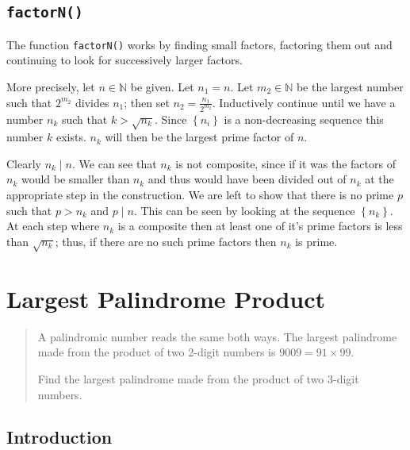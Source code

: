 \documentclass[oneside,12pt]{book}   	%
\newcounter{ex}
\newcounter{pr}
\theoremstyle{definition}
\newcommand{\set}[1]{\left\{#1\right\}}
\begin{document}
\begin{spacing}{1.618}
		\section{\texttt{factorN()}}
		
			The function \texttt{factorN()} works by finding small factors, factoring them out and continuing to look for successively larger factors.
		
			More precisely, let $n\in \mathbb{N}$ be given. Let $n_1=n$. Let $m_2\in\mathbb{N}$ be the largest number such that $2^{m_2}$ divides $n_1$; then set $n_2=\frac{n_1}{2^{m_2}}$. Inductively continue until we have a number $n_k$ such that $k>\sqrt{n_k}$. Since $\set{n_i}$ is a non-decreasing sequence this number $k$ exists. $n_k$ will then be the largest prime factor of $n$. 
			
			Clearly $n_k\mid n$. We can see that $n_k$ is not composite, since if it was the factors of $n_k$ would be smaller than $n_k$ and thus would have been divided out of $n_k$ at the appropriate step in the construction. We are left to show that there is no prime $p$ such that $p>n_k$ and $p\mid n$. This can be seen by looking at the sequence $\set{n_k}$. At each step where $n_k$ is a composite then at least one of it's prime factors is less than $\sqrt{n_k}$; thus, if there are no such prime factors then $n_k$ is prime. 

		

		


	\chapter{Largest Palindrome Product}
	
		\begin{quote}
			A palindromic number reads the same both ways. The largest palindrome made from the product of two 2-digit numbers is $9009 = 91\times 99$.

			Find the largest palindrome made from the product of two 3-digit numbers.
		\end{quote}
		
		\section{Introduction}
	

\end{spacing}
\end{document}
